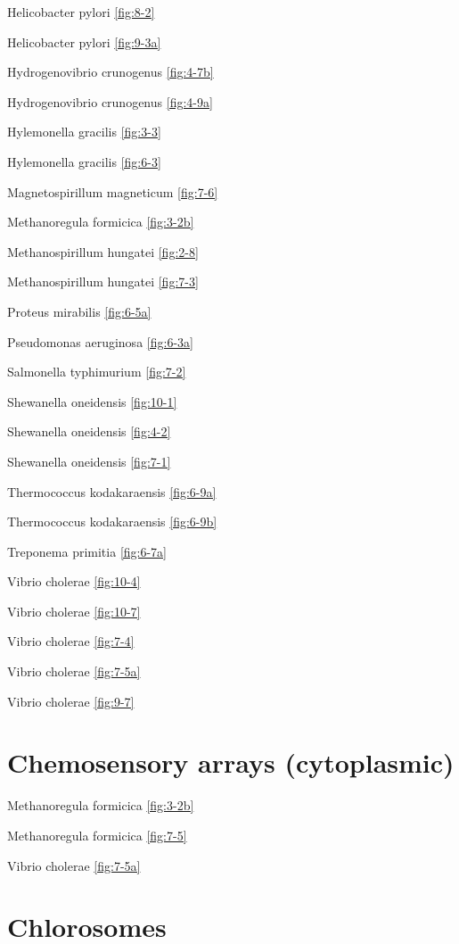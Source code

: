 \documentclass[]{tufte-book}
\begin{document}
Helicobacter pylori \ref{fig:8-2}

Helicobacter pylori \ref{fig:9-3a}

Hydrogenovibrio crunogenus \ref{fig:4-7b}

Hydrogenovibrio crunogenus \ref{fig:4-9a}

Hylemonella gracilis \ref{fig:3-3}

Hylemonella gracilis \ref{fig:6-3}

Magnetospirillum magneticum \ref{fig:7-6}

Methanoregula formicica \ref{fig:3-2b}

Methanospirillum hungatei \ref{fig:2-8}

Methanospirillum hungatei \ref{fig:7-3}

Proteus mirabilis \ref{fig:6-5a}

Pseudomonas aeruginosa \ref{fig:6-3a}

Salmonella typhimurium \ref{fig:7-2}

Shewanella oneidensis \ref{fig:10-1}

Shewanella oneidensis \ref{fig:4-2}

Shewanella oneidensis \ref{fig:7-1}

Thermococcus kodakaraensis \ref{fig:6-9a}

Thermococcus kodakaraensis \ref{fig:6-9b}

Treponema primitia \ref{fig:6-7a}

Vibrio cholerae \ref{fig:10-4}

Vibrio cholerae \ref{fig:10-7}

Vibrio cholerae \ref{fig:7-4}

Vibrio cholerae \ref{fig:7-5a}

Vibrio cholerae \ref{fig:9-7}

\hypertarget{chemosensory-arrays-cytoplasmic}{%
\section*{Chemosensory arrays (cytoplasmic)}\label{chemosensory-arrays-cytoplasmic}}

Methanoregula formicica \ref{fig:3-2b}

Methanoregula formicica \ref{fig:7-5}

Vibrio cholerae \ref{fig:7-5a}

\hypertarget{chlorosomes}{%
\section*{Chlorosomes}\label{chlorosomes}}
\end{document}
